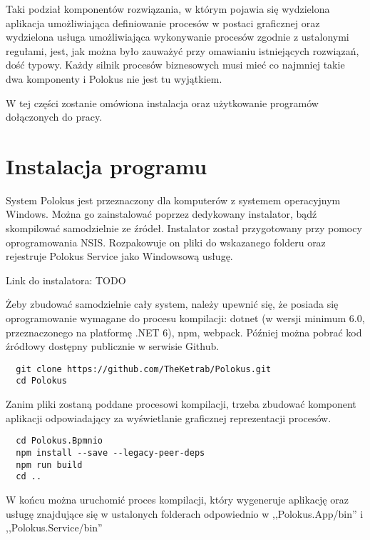 \documentclass[declaration,shortabstract,mgr]{iithesis}
\begin{document}
Taki podział komponentów rozwiązania, w którym pojawia się wydzielona aplikacja umożliwiająca definiowanie procesów w postaci graficznej oraz wydzielona usługa umożliwiająca wykonywanie procesów zgodnie z ustalonymi regułami, jest, jak można było zauważyć przy omawianiu istniejących rozwiązań, dość typowy. Każdy silnik procesów biznesowych musi mieć co najmniej takie dwa komponenty i Polokus nie jest tu wyjątkiem.

W tej części zostanie omówiona instalacja oraz użytkowanie programów dołączonych do pracy.

\section{Instalacja programu}

System Polokus jest przeznaczony dla komputerów z systemem operacyjnym Windows. Można go zainstalować poprzez dedykowany instalator, bądź skompilować samodzielnie ze źródeł. Instalator został przygotowany przy pomocy oprogramowania NSIS. Rozpakowuje on pliki do wskazanego folderu oraz rejestruje Polokus Service jako Windowsową usługę.

\noindent Link do instalatora: TODO

Żeby zbudować samodzielnie cały system, należy upewnić się, że posiada się oprogramowanie wymagane do procesu kompilacji: dotnet (w wersji minimum 6.0, przeznaczonego na platformę .NET 6), npm, webpack. Później można pobrać kod źródłowy dostępny publicznie w serwisie Github. 

\begin{minipage}[c]{\textwidth}
\centering
\begin{lstlisting}
  git clone https://github.com/TheKetrab/Polokus.git
  cd Polokus
\end{lstlisting}
\end{minipage}

Zanim pliki zostaną poddane procesowi kompilacji, trzeba zbudować komponent aplikacji odpowiadający za wyświetlanie graficznej reprezentacji procesów. 

\begin{minipage}[c]{\textwidth}
\centering
\begin{lstlisting}
  cd Polokus.Bpmnio
  npm install --save --legacy-peer-deps
  npm run build
  cd ..
\end{lstlisting}
\end{minipage}

W końcu można uruchomić proces kompilacji, który wygeneruje aplikację oraz usługę znajdujące się w ustalonych folderach odpowiednio w ,,Polokus.App/bin'' i ,,Polokus.Service/bin''
\end{document}
